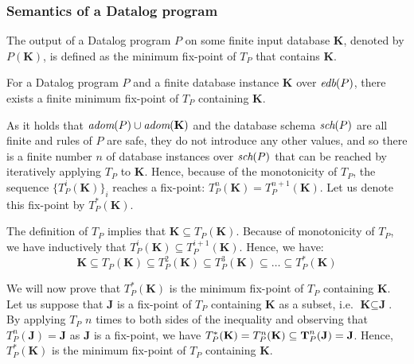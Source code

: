 \subsubsection{Semantics of a Datalog program}
The output of a Datalog program $P$ on some finite input database $\textbf{K}$, denoted by $P(\textbf{K})$, is defined as the minimum fix-point of $T_P$ that contains $\textbf{K}$.

\begin{thm}\label{t:datalogfixpointsem}
For a Datalog program $P$ and a finite database instance $\textbf{K}$ over $\textit{edb}(P)$, there exists a finite minimum fix-point of $T_P$ containing $\textbf{K}$.
\end{thm}
\begin{prof}
As it holds that $\textit{adom}(P) \cup \textit{adom}(\textbf{K})$ and the database schema $\textit{sch}(P)$ are all finite and rules of $P$ are safe, they do not introduce any other values, and so there is a finite number $n$ of database instances over $\textit{sch}(P)$ that can be reached by iteratively applying $T_P$ to $\textbf{K}$. Hence, because of the monotonicity of $T_P$, the sequence $\{T_P^i(\textbf{K})\}_i$ reaches a fix-point: $T_P^n(\textbf{K}) = T_P^{n+1}(\textbf{K})$. Let us denote this fix-point by $T_P^*(\textbf{K})$.

The definition of $T_P$ implies that $\textbf{K} \subseteq T_P(\textbf{K})$.
Because of monotonicity of $T_P$, we have inductively that $T_P^i(\textbf{K}) \subseteq T_P^{i+1}(\textbf{K})$.
Hence, we have:
$$\textbf{K} \subseteq T_P(\textbf{K}) \subseteq T_P^2(\textbf{K}) \subseteq T_P^3(\textbf{K}) \subseteq \dots \subseteq T_P^*(\textbf{K})$$

We will now prove that $T_P^*(\textbf{K})$ is the minimum fix-point of $T_P$ containing $\textbf{K}$. Let us suppose that $\textbf{J}$ is a fix-point of $T_P$ containing  $\textbf{K}$ as a subset, i.e.  $\textbf{K} \subseteq \textbf{J}$. By applying $T_P$ $n$ times to both sides of the inequality and observing that $T_P^n(\textbf{J}) = \textbf{J}$ as $\textbf{J}$ is a fix-point, we have $T_P^*(\textbf{K}) = T_P^n(\textbf{K}) \subseteq \textbf T_P^n(\textbf{J}) = \textbf{J}$. Hence, $T_P^*(\textbf{K})$ is the minimum fix-point of $T_P$ containing $\textbf{K}$. 

\QEDA
\end{prof}



